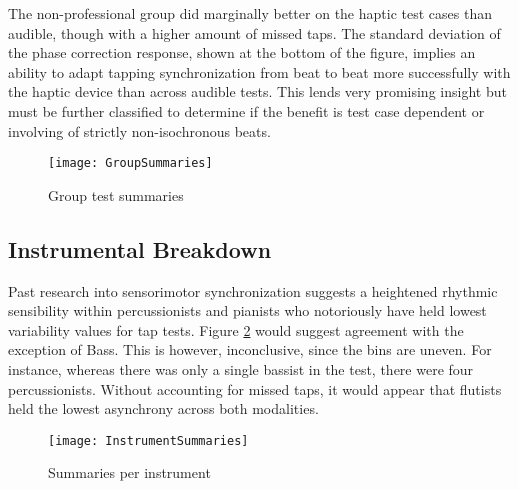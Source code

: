 The non-professional group did marginally better on the haptic test cases than audible, though with a higher amount of missed taps. The standard deviation of the phase correction response, shown at the bottom of the figure, implies an ability to adapt tapping synchronization from beat to beat more successfully with the haptic device than across audible tests. This lends very promising insight but must be further classified to determine if the benefit is test case dependent or involving of strictly non-isochronous beats.
\begin{figure}[H]
    \centering
    \texttt{[image: GroupSummaries]}
    \caption{Group test summaries}
    \label{fig:GroupSummaries}
\end{figure}

\subsection{Instrumental Breakdown}

Past research into sensorimotor synchronization suggests a heightened rhythmic sensibility within percussionists and pianists who notoriously have held lowest variability values for tap tests. Figure \ref{fig:InstrumentSummaries} would suggest agreement with the exception of Bass. This is however, inconclusive, since the bins are uneven. For instance, whereas there was only a single bassist in the test, there were four percussionists. Without accounting for missed taps, it would appear that flutists held the lowest asynchrony across both modalities.


\begin{figure}[H]
    \centering
    \texttt{[image: InstrumentSummaries]}
    \caption{Summaries per instrument}
    \label{fig:InstrumentSummaries}
\end{figure}

